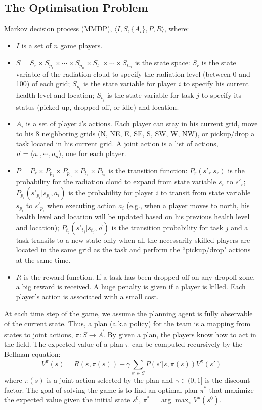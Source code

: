 
\subsection{The Optimisation Problem}
 Markov decision process (MMDP),
$\langle I, S, \{A_i\}, P, R \rangle$, where:
\begin{itemize}
  \item $I$ is a set of $n$ game players. 
  \item $S = S_r \times S_{p_1} \times \cdots \times S_{p_n}
      \times S_{t_1} \times \cdots \times S_{t_m}$ is the state
      space: $S_r$ is the state variable of the radiation cloud
      to specify the radiation level (between 0 and 100) of
      each grid; $S_{p_i}$ is the state variable for player $i$
      to specify his current health level and location;
      $S_{t_j}$ is the state variable for task $j$ to specify
      its status (picked up, dropped off, or idle) and
      location.
  \item $A_i$ is a set of player $i$'s actions. Each player can
      stay in his current grid, move to his 8 neighboring grids
      (N, NE, E, SE, S, SW, W, NW), or pickup/drop a task
      located in his current grid. A joint action is a list of
      actions, $\vec{a}=\langle a_1, \cdots, a_n \rangle$, one
      for each player.
  \item $P = P_r \times P_{p_1} \times P_{p_n} \times P_{t_1}
      \times P_{t_n}$ is the transition function:
      $P_r(s'_r|s_r)$ is the probability for the radiation
      cloud to expand from state variable $s_r$ to $s'_r$;
      $P_{p_i}(s'_{p_i}|s_{p_i}, a_i)$ is the probability for
      player $i$ to transit from state variable $s_{p_i}$ to
      $s'_{p_i}$ when executing action $a_i$ (e.g., when a
      player moves to north, his health level and location will
      be updated based on his previous health level and
      location); $P_{t_j}(s'_{t_j}|s_{t_j}, \vec{a})$ is the
      transition probability for task $j$ and a task transits
      to a new state only when all the necessarily skilled
      players are located in the same grid as the task and
      perform the ``pickup/drop" actions at the same time.
  \item $R$ is the reward function. If a task has been dropped
      off on any dropoff zone, a big reward is received. A huge
      penalty is given if a player is killed. Each player's
      action is associated with a small cost.
\end{itemize}
At each time step of the game, we assume the planning agent is
fully observable of the current state. Thus, a plan (a.k.a policy)
for the team is a mapping from states to joint actions, $\pi: S
\rightarrow \vec{A}$. By given a plan, the players know how to act
in the field. The expected value of a plan $\pi$ can be computed
recursively by the Bellman equation:
\begin{equation}
  V^\pi(s) = R(s, \pi(s)) + \gamma \sum_{s'\in S} P(s'|s, \pi(s)) V^\pi(s')
\end{equation}
where $\pi(s)$ is a joint action selected by the plan and $\gamma
\in (0, 1]$ is the discount factor. The goal of solving the game is
to find an optimal plan $\pi^*$ that maximize the expected value
given the initial state $s^0$, $\pi^* = \arg\max_{\pi} V^\pi(s^0)$.
